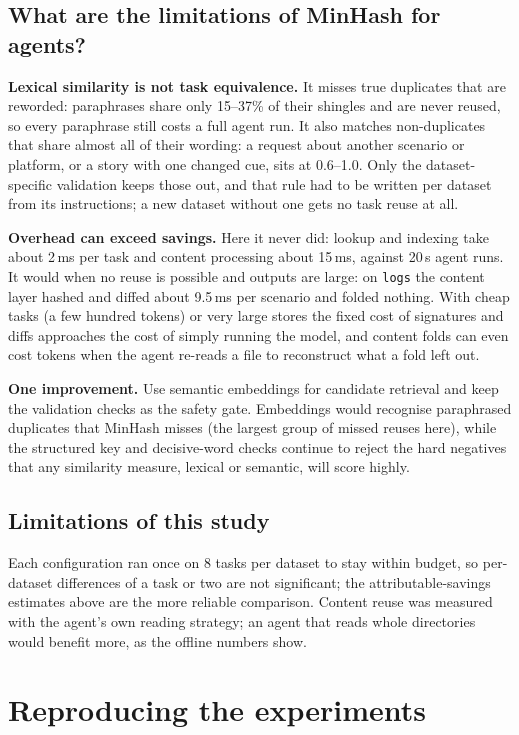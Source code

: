 \documentclass[11pt]{article}
\begin{document}
\subsection{What are the limitations of MinHash for agents?}

\textbf{Lexical similarity is not task equivalence.} It misses true duplicates that are
reworded: paraphrases share only 15--37\% of their shingles and are never reused, so every
paraphrase still costs a full agent run. It also matches non-duplicates that share almost all
of their wording: a request about another scenario or platform, or a story with one changed
cue, sits at 0.6--1.0. Only the dataset-specific validation keeps those out, and that rule
had to be written per dataset from its instructions; a new dataset without one gets no task
reuse at all.

\textbf{Overhead can exceed savings.} Here it never did: lookup and indexing take about
2\,ms per task and content processing about 15\,ms, against 20\,s agent runs. It would when
no reuse is possible and outputs are large: on \texttt{logs} the content layer hashed and
diffed about 9.5\,ms per scenario and folded nothing. With cheap tasks (a few hundred tokens)
or very large stores the fixed cost of signatures and diffs approaches the cost of simply
running the model, and content folds can even cost tokens when the agent re-reads a file to
reconstruct what a fold left out.

\textbf{One improvement.} Use semantic embeddings for candidate retrieval and keep the
validation checks as the safety gate. Embeddings would recognise paraphrased duplicates that
MinHash misses (the largest group of missed reuses here), while the structured key and
decisive-word checks continue to reject the hard negatives that any similarity measure,
lexical or semantic, will score highly.

\subsection{Limitations of this study}

Each configuration ran once on 8 tasks per dataset to stay within budget, so per-dataset
differences of a task or two are not significant; the attributable-savings estimates above
are the more reliable comparison. Content reuse was measured with the agent's own reading
strategy; an agent that reads whole directories would benefit more, as the offline numbers
show.

\appendix
\section{Reproducing the experiments}
\end{document}
